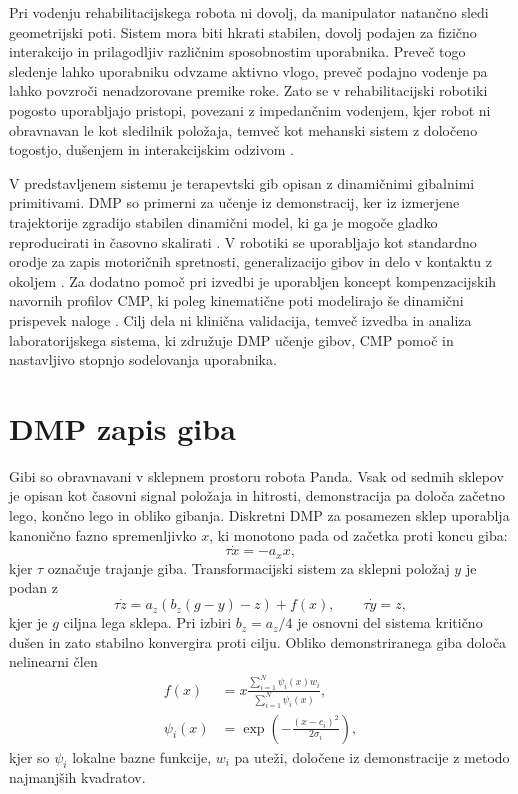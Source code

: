 \documentclass[a4paper]{article}
\begin{document}
Pri vodenju rehabilitacijskega robota ni dovolj, da manipulator natančno sledi
geometrijski poti. Sistem mora biti hkrati stabilen, dovolj podajen za fizično
interakcijo in prilagodljiv različnim sposobnostim uporabnika. Preveč togo
sledenje lahko uporabniku odvzame aktivno vlogo, preveč podajno vodenje pa lahko
povzroči nenadzorovane premike roke. Zato se v rehabilitacijski robotiki pogosto
uporabljajo pristopi, povezani z impedančnim vodenjem, kjer robot ni obravnavan
le kot sledilnik položaja, temveč kot mehanski sistem z določeno togostjo,
dušenjem in interakcijskim odzivom \cite{hogan1985impedance}.

V predstavljenem sistemu je terapevtski gib opisan z dinamičnimi gibalnimi
primitivami. DMP so primerni za učenje iz demonstracij, ker iz izmerjene
trajektorije zgradijo stabilen dinamični model, ki ga je mogoče gladko
reproducirati in časovno skalirati \cite{schaal2006dmp,ijspeert2013dmp}. V
robotiki se uporabljajo kot standardno orodje za zapis motoričnih spretnosti,
generalizacijo gibov in delo v kontaktu z okoljem \cite{saveriano2023dmp}. Za
dodatno pomoč pri izvedbi je uporabljen koncept kompenzacijskih navornih
profilov CMP, ki poleg kinematične poti modelirajo še dinamični prispevek naloge
\cite{denisa2016cmp,petric2018cmp}. Cilj dela ni klinična validacija, temveč
izvedba in analiza laboratorijskega sistema, ki združuje DMP učenje gibov, CMP
pomoč in nastavljivo stopnjo sodelovanja uporabnika.

\section{DMP zapis giba}

Gibi so obravnavani v sklepnem prostoru robota Panda. Vsak od sedmih sklepov je
opisan kot časovni signal položaja in hitrosti, demonstracija pa določa začetno
lego, končno lego in obliko gibanja. Diskretni DMP za posamezen sklep uporablja
kanonično fazno spremenljivko $x$, ki monotono pada od začetka proti koncu giba:
\begin{equation}
    \tau \dot{x} = -a_x x ,
    \label{eq:canonical}
\end{equation}
kjer $\tau$ označuje trajanje giba. Transformacijski sistem za sklepni položaj
$y$ je podan z
\begin{equation}
    \tau \dot{z} = a_z \left(b_z (g-y) - z \right) + f(x),
    \qquad
    \tau \dot{y} = z ,
    \label{eq:transform}
\end{equation}
kjer je $g$ ciljna lega sklepa. Pri izbiri $b_z=a_z/4$ je osnovni del sistema
kritično dušen in zato stabilno konvergira proti cilju. Obliko demonstriranega
giba določa nelinearni člen
\begin{align}
    f(x) &=
    x\frac{\sum_{i=1}^{N} \psi_i(x) w_i}
         {\sum_{i=1}^{N} \psi_i(x)}, \nonumber\\
    \psi_i(x) &= \exp\left(-\frac{(x-c_i)^2}{2\sigma_i}\right),
    \label{eq:forcing}
\end{align}
kjer so $\psi_i$ lokalne bazne funkcije, $w_i$ pa uteži, določene iz
demonstracije z metodo najmanjših kvadratov.
\end{document}

